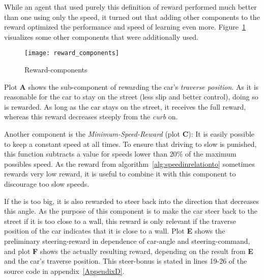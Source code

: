 While an agent that used purely this definition of reward performed much better than one using only the speed, it turned out that adding other components to the reward optimized the performance and speed of learning even more. Figure~\ref{fig:reward} visualizes some other components that were additionally used. 

\begin{figure}[h]
	\centering 
	\begin{annotatedFigure}
		{\texttt{[image: reward\_components]}}
	\end{annotatedFigure}
	\caption{Reward-components}
	\label{fig:reward}
\end{figure}

Plot \textbf{A} shows the sub-component of rewarding the car's \textit{traverse position}. As it is reasonable for the car to stay on the street (less slip and better control), doing so is rewarded. As long as the car stays on the street, it receives the full reward, whereas this reward decreases steeply from the \textit{curb} on.

Another component is the \textit{Minimum-Speed-Reward} (plot \textbf{C}): It is easily possible to keep a constant speed at all times. To ensure that driving to slow is punished, this function subtracts a value for speeds lower than $20\%$ of the maximum possibles speed. As the reward from algorithm~\ref{alg:speedinrelationto} sometimes rewards very low reward, it is useful to combine it with this component to discourage too slow speeds.

If the  is too big, it is also rewarded to steer back into the direction that decreases this angle. As the purpose of this component is to make the car steer back to the street if it is too close to a wall, this reward is only relevant if the traverse position of the car indicates that it is close to a wall. Plot \textbf{E} shows the preliminary steering-reward in dependence of car-angle and steering-command, and plot \textbf{F} shows the actually resulting reward, depending on the result from \textbf{E} and the car's traverse position. This steer-bonus is stated in lines 19-26 of the source code in appendix~\ref{AppendixD}. 

